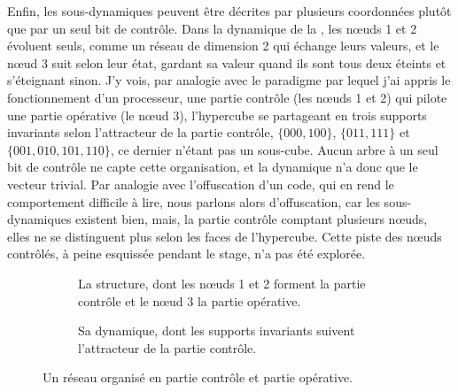 Enfin, les sous-dynamiques peuvent être décrites par plusieurs coordonnées plutôt que par un seul bit de contrôle.
Dans la dynamique de la , les nœuds 1 et 2 évoluent seuls, comme un réseau de dimension 2 qui échange leurs valeurs, et le nœud 3 suit selon leur état, gardant sa valeur quand ils sont tous deux éteints et s'éteignant sinon.
J'y vois, par analogie avec le paradigme par lequel j'ai appris le fonctionnement d'un processeur, une partie contrôle (les nœuds 1 et 2) qui pilote une partie opérative (le nœud 3), l'hypercube se partageant en trois supports invariants selon l'attracteur de la partie contrôle, $\{000, 100\}$, $\{011, 111\}$ et $\{001, 010, 101, 110\}$, ce dernier n'étant pas un sous-cube.
Aucun arbre à un seul bit de contrôle ne capte cette organisation, et la dynamique n'a donc que le vecteur trivial.
Par analogie avec l'offuscation d'un code, qui en rend le comportement difficile à lire, nous parlons alors d'offuscation, car les sous-dynamiques existent bien, mais, la partie contrôle comptant plusieurs nœuds, elles ne se distinguent plus selon les faces de l'hypercube.
Cette piste des nœuds contrôlés, à peine esquissée pendant le stage, n'a pas été explorée.

\begin{figure}[H]
    \centering
    \begin{subfigure}{0.48\linewidth}
        \centering
        \caption{La structure, dont les nœuds 1 et 2 forment la partie contrôle et le nœud 3 la partie opérative.}
    \end{subfigure}
    \hfill
    \begin{subfigure}{0.48\linewidth}
        \centering
        \caption{Sa dynamique, dont les supports invariants suivent l'attracteur de la partie contrôle.}
    \end{subfigure}
    \caption{Un réseau organisé en partie contrôle et partie opérative.}
    \label{fig:pcpo-3d}
\end{figure}

